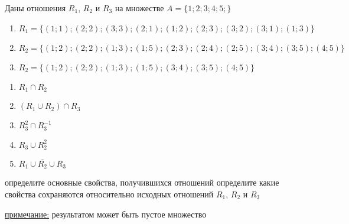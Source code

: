 \question
Даны отношения $R_1$, $R_2$ и $R_3$ на множестве $A = \{1; 2; 3; 4; 5;\}$ 
\begin{enumerate}
	\renewcommand{\labelenumi}{\alph{enumi})}
	\item $R_1 = \{(1; 1); (2; 2); (3; 3); (2; 1); (1; 2); (2; 3); (3; 2); (3; 1); (1; 3)\}$
	\item $R_2 = \{(1; 2); (2; 2); (1; 3); (1; 5); (2; 3); (2; 4); (2; 5); (3; 4); (3; 5); (4; 5)\}$
	\item $R_2 = \{(1; 2); (2; 2); (1; 3); (1; 5); (3; 4); (3; 5); (4; 5)\}$
\end{enumerate}

\begin{enumerate}
	\renewcommand{\labelenumi}{\alph{enumi})}
	\item $R_1 \cap R_2$
	\item $(R_1 \cup R_2) \cap R_3$
	\item $R_3^2 \cap R_3^{-1}$
	\item $R_3 \cup R_2^2$
	\item $R_1 \cup \overline{R_2} \cup R_3$
\end{enumerate}

определите основные свойства, получившихся отношений
определите какие свойства сохраняются относительно исходных отношений $R_1$, $R_2$ и $R_3$ 

\underline{примечание:} результатом может быть пустое множество